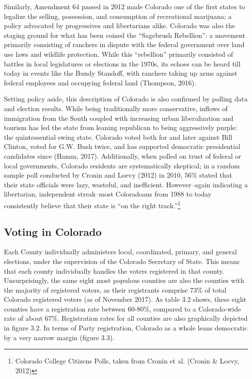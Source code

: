 \documentclass[12pt,twoside]{reedthesis}
\begin{document}
  Similarly, Amendment 64 passed in 2012 made Colorado one of the first
  states to legalize the selling, possession, and consumption of
  recreational marijuana; a policy advocated by progressives and
  libertarians alike. Colorado was also the staging ground for what has
  been coined the ``Sagebrush Rebellion'': a movement primarily consisting
  of ranchers in dispute with the federal government over land use laws
  and wildlife protection. While this ``rebellion'' primarily consisted of
  battles in local legislatures or elections in the 1970s, its echoes can
  be heard till today in events like the Bundy Standoff, with ranchers
  taking up arms against federal employees and occupying federal land
  (Thompson, 2016).
  
  Setting policy aside, this description of Colorado is also confirmed by
  polling data and election results. While being traditionally more
  conservative, inflows of immigration from the South coupled with
  increasing urban liberalization and tourism has led the state from
  leaning republican to being aggressively purple: the quintessential
  swing state. Colorado voted both for and later against Bill Clinton,
  voted for G.W. Bush twice, and has supported democratic presidential
  candidates since (Hamm, 2017). Additionally, when polled on trust of
  federal or local governments, Colorado residents are systematically
  skeptical; in a random sample poll conducted by Cronin and Loevy (2012)
  in 2010, 56\% stated that their state officials were lazy, wasteful, and
  inefficient. However--again indicating a libertarian, independent
  streak--most Coloradoans from 1988 to today consistently believe that
  their state is ``on the right track.''\footnote{Colorado College
    Citizens Polls, taken from Cronin et al. (Cronin \& Loevy, 2012)}
  
  \subsection{Voting in Colorado}\label{voting-in-colorado}
  
  Each County individually administers local, coordinated, primary, and
  general elections, under the supervision of the Colorado Secretary of
  State. This means that each county individually handles the voters
  registered in that county. Unsurprisingly, the same eight most populous
  counties are also the counties with the majority of registered voters,
  as their registrants comprise 73\% of total Colorado registered voters
  (as of November 2017). As table 3.2 shows, these eight counties have a
  registration rate between 60-80\%, compared to a Colorado-wide rate of
  about 67\%. Registration rates for all counties are also graphically
  depicted in figure 3.2. In terms of Party registration, Colorado as a
  whole leans democratic by a very narrow margin (figure 3.3).
  
\end{document}

